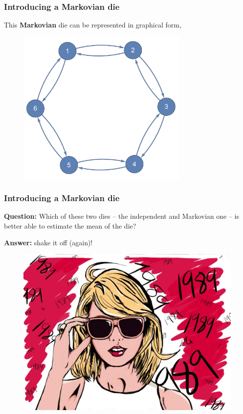 \documentclass[handout]{beamer}
\begin{document}
\begin{frame}
	\frametitle{Introducing a Markovian die}
	 This \textbf{Markovian} die can be represented in graphical form,
	
	\begin{figure}[ht]
		\centerline{\includegraphics[width=0.75\textwidth]{./Figures/lec6_dependentDie.pdf}}
	\end{figure}
	
\end{frame}

\begin{frame}
	\frametitle{Introducing a Markovian die}
	 \textbf{Question:} Which of these two dies -- the independent and Markovian one -- is better able to estimate the mean of the die?
	
	 \textbf{Answer:} shake it off (again)!
	
	\begin{figure}[ht]
		\centerline{\includegraphics[width=1.0\textwidth]{./Figures/taylorSwift.jpg}}
	\end{figure}
	
\end{frame}
\end{document}
